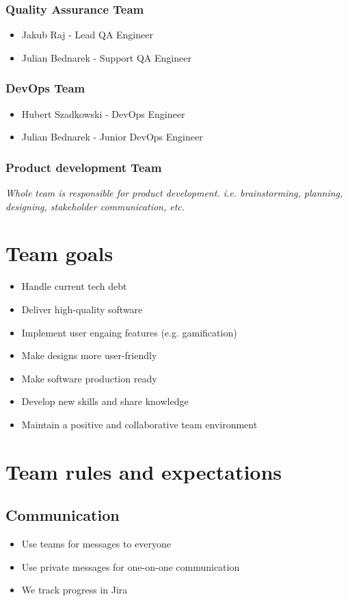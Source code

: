 \documentclass[12pt]{article}
\begin{document}
\subsubsection*{Quality Assurance Team}
\begin{itemize}
    \item Jakub Raj - Lead QA Engineer
    \item Julian Bednarek - Support QA Engineer
\end{itemize}
\subsubsection*{DevOps Team}
\begin{itemize}
    \item Hubert Szadkowski - DevOps Engineer
    \item Julian Bednarek - Junior DevOps Engineer
\end{itemize}
\subsubsection*{Product development Team}
\textit{Whole team is responsible for product development. i.e. brainstorming, planning, designing, stakeholder communication, etc.}
\section{Team goals}
\begin{itemize}
    \item Handle current tech debt
    \item Deliver high-quality software
    \item Implement user engaing features (e.g. gamification)
    \item Make designs more user-friendly
    \item Make software production ready
    \item Develop new skills and share knowledge
    \item Maintain a positive and collaborative team environment
\end{itemize}
\section{Team rules and expectations}
\subsection{Communication}
\begin{itemize}
    \item Use teams for messages to everyone
    \item Use private messages for one-on-one communication
    \item We track progress in Jira
\end{itemize}
\end{document}
